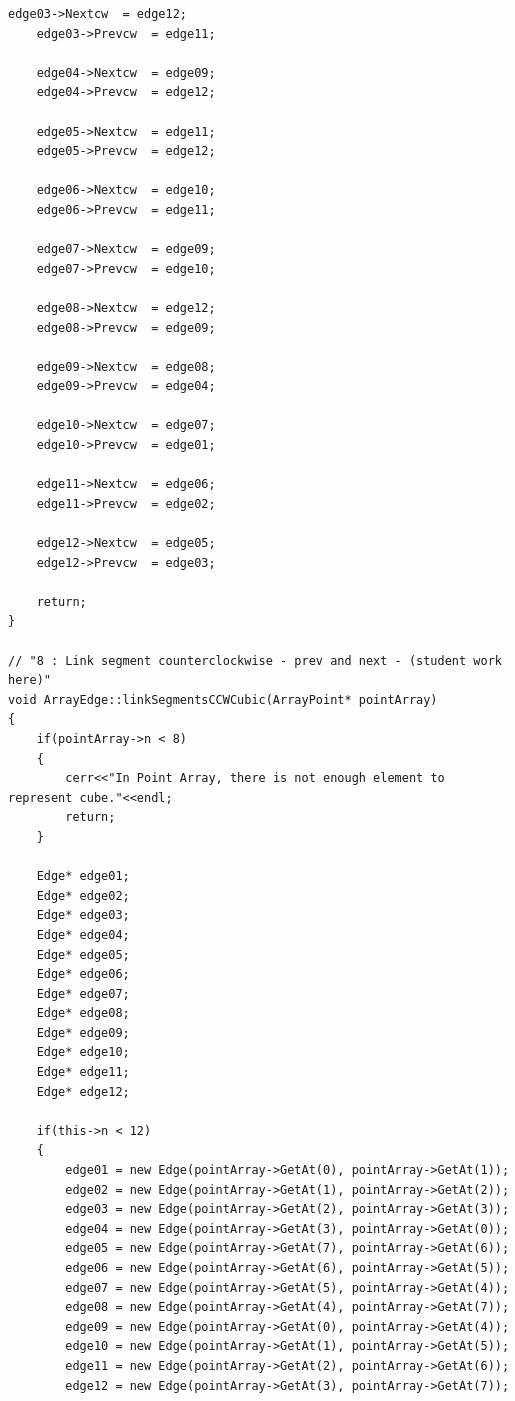 \documentclass{article}
\begin{document}
\begin{lstlisting}[label=exercice-cpp, caption=Exercice.cpp]
    edge03->Nextcw  = edge12;
    edge03->Prevcw  = edge11;

    edge04->Nextcw  = edge09;
    edge04->Prevcw  = edge12;

    edge05->Nextcw  = edge11;
    edge05->Prevcw  = edge12;

    edge06->Nextcw  = edge10;
    edge06->Prevcw  = edge11;

    edge07->Nextcw  = edge09;
    edge07->Prevcw  = edge10;

    edge08->Nextcw  = edge12;
    edge08->Prevcw  = edge09;

    edge09->Nextcw  = edge08;
    edge09->Prevcw  = edge04;

    edge10->Nextcw  = edge07;
    edge10->Prevcw  = edge01;

    edge11->Nextcw  = edge06;
    edge11->Prevcw  = edge02;

    edge12->Nextcw  = edge05;
    edge12->Prevcw  = edge03;

    return;
}

// "8 : Link segment counterclockwise - prev and next - (student work here)"
void ArrayEdge::linkSegmentsCCWCubic(ArrayPoint* pointArray)
{
    if(pointArray->n < 8)
    {
        cerr<<"In Point Array, there is not enough element to represent cube."<<endl;
        return;
    }

    Edge* edge01;
    Edge* edge02;
    Edge* edge03;
    Edge* edge04;
    Edge* edge05;
    Edge* edge06;
    Edge* edge07;
    Edge* edge08;
    Edge* edge09;
    Edge* edge10;
    Edge* edge11;
    Edge* edge12;

    if(this->n < 12)
    {
        edge01 = new Edge(pointArray->GetAt(0), pointArray->GetAt(1));
        edge02 = new Edge(pointArray->GetAt(1), pointArray->GetAt(2));
        edge03 = new Edge(pointArray->GetAt(2), pointArray->GetAt(3));
        edge04 = new Edge(pointArray->GetAt(3), pointArray->GetAt(0));
        edge05 = new Edge(pointArray->GetAt(7), pointArray->GetAt(6));
        edge06 = new Edge(pointArray->GetAt(6), pointArray->GetAt(5));
        edge07 = new Edge(pointArray->GetAt(5), pointArray->GetAt(4));
        edge08 = new Edge(pointArray->GetAt(4), pointArray->GetAt(7));
        edge09 = new Edge(pointArray->GetAt(0), pointArray->GetAt(4));
        edge10 = new Edge(pointArray->GetAt(1), pointArray->GetAt(5));
        edge11 = new Edge(pointArray->GetAt(2), pointArray->GetAt(6));
        edge12 = new Edge(pointArray->GetAt(3), pointArray->GetAt(7));


\end{lstlisting}
\end{document}
